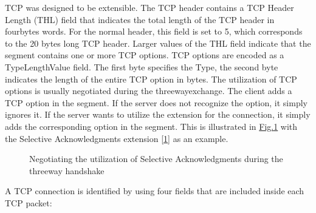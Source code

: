 \documentclass[letterpaper,10pt,english]{sphinxmanual}
\begin{document}
TCP was designed to be extensible. The TCP header contains a TCP Header Length (THL) field that indicates the total length of the TCP header in four\sphinxhyphen{}bytes words. For the normal header, this field is set to 5, which corresponds to the 20 bytes long TCP header. Larger values of the THL field indicate that the segment contains one or more TCP options. TCP options are encoded as a Type\sphinxhyphen{}Length\sphinxhyphen{}Value field. The first byte specifies the Type, the second byte indicates the length of the entire TCP option in bytes. The utilization of TCP options is usually negotiated during the three\sphinxhyphen{}way\sphinxhyphen{}exchange. The client adds a TCP option in the  segment. If the server does not recognize the option, it simply ignores it. If the server wants to utilize the extension for the connection, it simply adds the corresponding option in the  segment. This is illustrated in \hyperref[\detokenize{tcp:fig-tcp-handshake-sack}]{Fig.\@ \ref{\detokenize{tcp:fig-tcp-handshake-sack}}} with the Selective Acknowledgments extension {[}\hyperlink{cite.biblio:id1948}{1}{]} as an example.
\begin{figure}[htbp]\centering\capstart{}\caption{Negotiating the utilization of Selective Acknowledgments during the three\sphinxhyphen{}way handshake}\label{\detokenize{tcp:id6}}\label{\detokenize{tcp:fig-tcp-handshake-sack}}\end{figure}
\sphinxAtStartPar
A TCP connection is identified by using four fields that are included inside each TCP packet:
\end{document}
